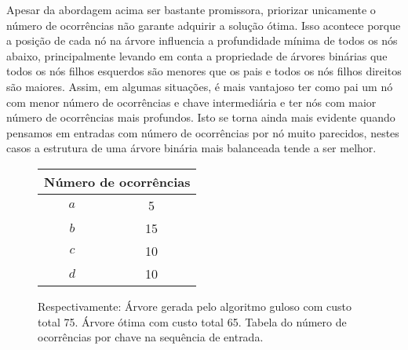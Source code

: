Apesar da abordagem acima ser bastante promissora, priorizar unicamente o número de ocorrências não garante adquirir a solução ótima. Isso acontece porque a posição de cada nó na árvore influencia a profundidade mínima de todos os nós abaixo, principalmente levando em conta a propriedade de árvores binárias que todos os nós filhos esquerdos são menores que os pais e todos os nós filhos direitos são maiores. Assim, em algumas situações, é mais vantajoso ter como pai um nó com menor número de ocorrências e chave intermediária e ter nós com maior número de ocorrências mais profundos. Isto se torna ainda mais evidente quando pensamos em entradas com número de ocorrências por nó muito parecidos, nestes casos a estrutura de uma árvore binária mais balanceada tende a ser melhor.


\begin{figure}[h]
\centering
\begin{minipage}[c]{0.3\textwidth}
\centering
{}
\end{minipage}
\begin{minipage}[c]{0.3\textwidth}
\centering
{}
\end{minipage}
\begin{minipage}[c]{0.3\textwidth}
\centering
\begin{tabular}{|c|c|}
\hline
\multicolumn{2}{|c|}{\textbf{Número de ocorrências}} \\
\hline
\textbf{$a$} & 5 \\
$b$ & 15 \\
$c$ & 10 \\
$d$ & 10 \\
\hline
\end{tabular}
\end{minipage}
\caption{Respectivamente: Árvore gerada pelo algoritmo guloso com custo total 75. Árvore ótima com custo total 65. Tabela do número de ocorrências por chave na sequência de entrada.}
\end{figure}

